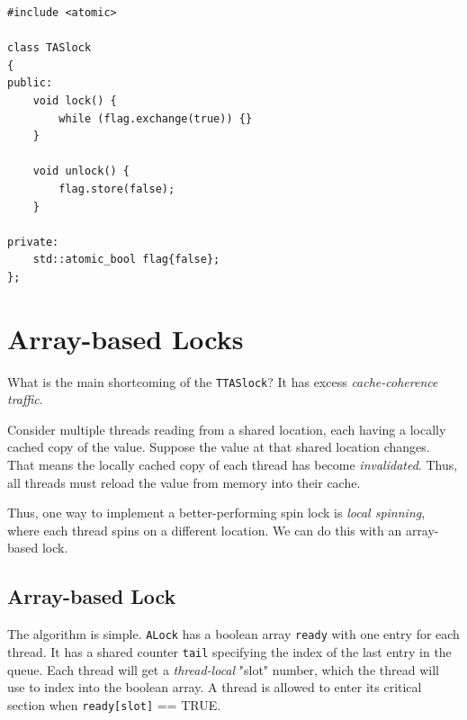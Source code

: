 \makebox[\linewidth]{\rule{17cm}{0.4pt}}
{\centering \label{code:TAS_lock}
\begin{verbatim}
#include <atomic>

class TASlock
{
public:
    void lock() {
        while (flag.exchange(true)) {}
    }

    void unlock() {
        flag.store(false);
    }

private:
    std::atomic_bool flag{false};
};
\end{verbatim}
\makebox[\linewidth]{\rule{17cm}{0.4pt}}
}

\section{Array-based Locks}
What is the main shortcoming of the \verb|TTASlock|? It has excess \textit{cache-coherence traffic}.

\begin{definition}
    Consider multiple threads reading from a shared location, each having a locally cached copy of the value. Suppose the value at that shared location changes. That means the locally cached copy of each thread has become \textit{invalidated}. Thus, all threads must reload the value from memory into their cache.
\end{definition}

Thus, one way to implement a better-performing spin lock is \textit{local spinning}, where each thread spins on a different location. We can do this with an array-based lock.

\subsection{Array-based Lock}
The algorithm is simple. \verb|ALock| has a boolean array \verb|ready| with one entry for each thread. It has a shared counter \verb|tail| specifying the index of the last entry in the queue. Each thread will get a \textit{thread-local} "slot" number, which the thread will use to index into the boolean array. A thread is allowed to enter its critical section when \verb|ready[slot]| == TRUE.

